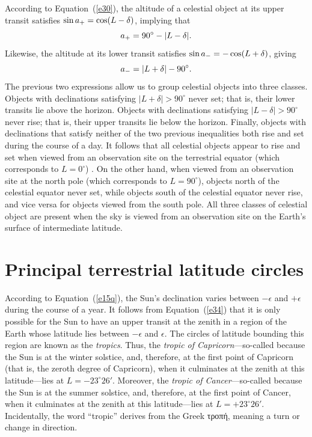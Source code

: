 According to Equation~(\ref{e30}), the altitude of a celestial object at its upper
transit satisfies $\sin a_{\rm +} = \cos (L-\delta)$, implying that
\begin{equation}\label{e34}
a_{\rm +} = 90^\circ - |L-\delta|.
\end{equation}
Likewise, the altitude at its lower transit satisfies
$\sin a_{\rm -} =- \cos (L+\delta)$, giving
\begin{equation}\label{e35}
a_{\rm -} = |L+\delta| - 90^\circ.
\end{equation}
The previous two expressions allow us to group celestial objects into
three classes. Objects with declinations
satisfying $|L+\delta|> 90^\circ$  never set; that is, their
lower transits lie above the horizon. Objects with declinations
satisfying $|L-\delta|>90^\circ$  never rise; that is,
their upper transits lie below the horizon. Finally, objects with
declinations that satisfy neither of the two previous inequalities
both  rise and set  during the course of a day. It follows that all celestial objects appear to rise and set  when viewed from an observation  site on the
terrestrial equator (which corresponds to $L=0^\circ$) . On the other hand, when viewed from an observation site at the north pole (which corresponds to  $L=90^\circ$),
objects north of the celestial equator never set, while objects south of the
celestial equator never rise, and  vice versa  for objects viewed from the south pole.  All three classes of
celestial object are present when the sky is viewed  from an observation site on the Earth's surface of intermediate latitude.

\section{Principal terrestrial latitude circles}
According to Equation~(\ref{e15q}),  the Sun's
declination varies between $-\epsilon$ and $+\epsilon$ during the course of
a year. 
It follows from Equation~(\ref{e34}) that it is only possible for the  Sun to have an
upper transit at the
zenith  in a region of the Earth whose
latitude lies between $-\epsilon$
and $\epsilon$. The  circles of latitude bounding this region are known
as the {\em tropics}. Thus, the {\em tropic of Capricorn}---so-called
because the Sun is at the winter solstice, and, therefore, at the
first point of Capricorn (that is, the zeroth degree of Capricorn), when  it culminates at the
zenith at this latitude---lies at  $L=-23^\circ 26'$. Moreover,
the {\em tropic of Cancer}---so-called
because the Sun is at the summer solstice, and, therefore, at the
first point of Cancer, when  it culminates at the
zenith at this latitude---lies at $L=+23^\circ 26'$. Incidentally, the word ``tropic'' derives from the Greek  τροπή, meaning a turn or change in direction.

